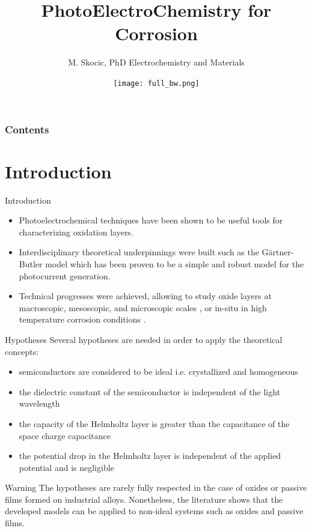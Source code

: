 \documentclass[10pt,compress]{beamer}
\title{PhotoElectroChemistry for Corrosion}
\author{M. Skocic, PhD Electrochemistry and Materials}
\date{\vfill \texttt{[image: full\_bw.png]}}
\begin{document}
\begin{frame}
    \titlepage
\end{frame}

\begin{frame}
    \frametitle{Contents}
    \tableofcontents
\end{frame}



\section{Introduction}
    \begin{frame}{Introduction}
        \begin{itemize}
            \item Photoelectrochemical techniques have been shown to be useful tools for characterizing oxidation layers. 
            \item Interdisciplinary theoretical underpinnings were built \citep{morrison1980, vijh1969, stimming1986, diquarto1997, wouters2007} 
                  such as the Gärtner-Butler model \citep{gartner1959,butler1977}
                  which has been proven to be a simple and robust model for the photocurrent generation. 
            \item Technical progresses were achieved, allowing to study oxide layers at 
                  macroscopic, mesoscopic, and microscopic scales 
                  \citep{benaboud2007, srisrual2011}, or in-situ in high temperature corrosion 
                  conditions \citep{bojinov2002,skocic2016}.
        \end{itemize}
    \end{frame}

    \begin{frame}{Hypotheses}
        Several hypotheses are needed in order to apply the theoretical concepts:  
        \begin{itemize}
            \item semiconductors are considered to be ideal i.e. crystallized and homogeneous  
            \item the dielectric constant of the semiconductor is independent of the light wavelength  
            \item the capacity of the Helmholtz layer is greater than the capacitance of the space charge capacitance  
            \item the potential drop in the Helmholtz layer is independent of the applied potential and is negligible
        \end{itemize}

        \footnotesize
        \begin{alertblock}{Warning}
            The hypotheses are rarely fully respected in the case of oxides or passive 
            films formed on industrial alloys. Nonetheless, the literature shows that the 
            developed models can be applied to non-ideal systems such as oxides 
            and passive films.
        \end{alertblock}
    \end{frame}
\end{document}
